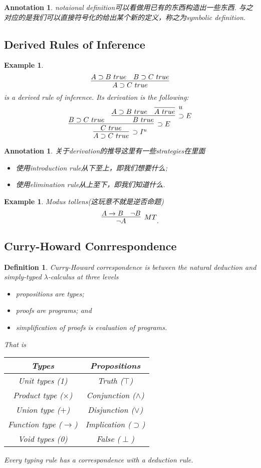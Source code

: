 \documentclass{article}
\theoremstyle{plain}
\newtheorem{example}[theorem]{Example}
\newtheorem{definition}[theorem]{Definition}
\newtheorem{annotation}[theorem]{Annotation}
\theoremstyle{nonumberplain}
\begin{document}
\begin{annotation}
\rm notaional definition可以看做用已有的东西构造出一些东西. 与之对应的是我们可以直接符号化的给出某个新的定义，称之为symbolic definition. 
\end{annotation}

\newpage
\subsection{Derived Rules of Inference}

\begin{example}
\rm 
$$
\infer{A \supset C~true}{A \supset B~true & B \supset C~true}
$$
is a derived rule of inference. Its derivation is the following:
$$
\infer[\supset I^u]{A \supset C~true}{\infer[\supset E]{C~true}{B \supset C~true & \infer[\supset E]{B~true}{A \supset B~true & \infer[u]{A~true}{}}}}
$$
\end{example}

\begin{annotation}
\rm 关于derivation的推导这里有一些strategies在里面
\begin{itemize}
	\item 使用introduction rule从下至上，即我们想要什么;
	\item 使用elimination rule从上至下，即我们知道什么.
\end{itemize}
\end{annotation}

\begin{example}
\rm Modus tollens(这玩意不就是逆否命题)
$$
\infer[MT]{\neg A}{A \to B & \neg B}.
$$
\end{example}


\newpage
\subsection{Curry-Howard Conrrespondence}

\begin{definition}
\rm Curry-Howard correspondence is between the natural deduction and simply-typed $\lambda$-calculus at three levels
\begin{itemize}
	\item propositions are types;
	\item proofs are programs; and
	\item simplification of proofs is evaluation of programs.
\end{itemize}
That is
\begin{center}
\begin{tabular}{c|c}
Types & Propositions \\
\hline
Unit types (1) & Truth ($\top$)\\
\hline
Product type ($\times$) & Conjunction ($\wedge$) \\
\hline
Union type ($+$)& Disjunction ($\vee$) \\
\hline
Function type ($\to$) & Implication ($\supset$)\\
\hline
Void types (0) & False ($\perp$)
\end{tabular}
\end{center}
Every typing rule has a correspondence with a deduction rule. 
\end{definition}
\end{document}
